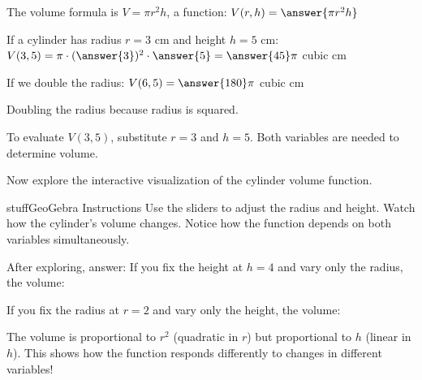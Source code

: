 \documentclass{ximera}
\begin{document}
\begin{problem}
The volume formula is $V = \pi r^2 h$, a function: $V(r, h) = \answer{\pi r^2 h}$

If a cylinder has radius $r = 3$ cm and height $h = 5$ cm:
$V(3, 5) = \pi \cdot (\answer{3})^2 \cdot \answer{5} = \answer{45}\pi$ cubic cm

If we double the radius: $V(6, 5) = \answer{180}\pi$ cubic cm

Doubling the radius  because radius is squared.

\begin{feedback}
To evaluate $V(3,5)$, substitute $r=3$ and $h=5$. Both variables are needed to determine volume.
\end{feedback}
\end{problem}

\begin{problem}
Now explore the interactive visualization of the cylinder volume function.

\begin{expandable}{stuff}{GeoGebra Instructions}
    Use the sliders to adjust the radius and height. Watch how the cylinder's volume changes. Notice how the function depends on both variables simultaneously.
\end{expandable}

\begin{center}
\end{center}

After exploring, answer: If you fix the height at $h=4$ and vary only the radius, the volume:
\begin{multipleChoice}
\end{multipleChoice}

If you fix the radius at $r=2$ and vary only the height, the volume:
\begin{multipleChoice}
\end{multipleChoice}

\begin{feedback}
The volume is proportional to $r^2$ (quadratic in $r$) but proportional to $h$ (linear in $h$). This shows how the function responds differently to changes in different variables!
\end{feedback}
\end{problem}
\end{document}
